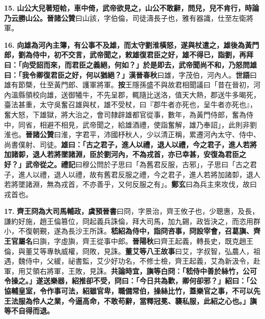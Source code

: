 \textbf{15.} \textbf{山公大兒著短帢，車中倚，武帝欲見之，山公不敢辭，問兒，兒不肯行，時論乃云勝山公。}{\footnotesize \textbf{晉諸公贊}曰山該，字伯倫，司徒濤長子也，雅有器識，仕至左衛將軍。}

\textbf{16.} \textbf{向雄為河內主簿，有公事不及雄，而太守劉淮橫怒，遂與杖遣之，雄後為黃門郎，劉為侍中，初不交言，武帝聞之，敕雄復君臣之好，雄不得已，詣劉，再拜曰：「向受詔而來，而君臣之義絕，何如？」於是即去，武帝聞尚不和，乃怒問雄曰：「我令卿復君臣之好，何以猶絕？」}{\footnotesize \textbf{漢晉春秋}曰雄，字茂伯，河內人。\textbf{世語}曰雄有節槩，仕至黃門郎、護軍將軍。\textbf{按}王隱孫盛不與故君相聞議曰「昔在晉初，河內溫縣領校向雄，送御犧牛，不先呈郡，輒隨比送洛，值天大熱，郡送牛多暍死，臺法甚重，太守吳奮召雄與杖，雄不受杖，曰『郡牛者亦死也，呈牛者亦死也』，奮大怒，下雄獄，將大治之，會司隸辟雄都官從事，數年，為黃門侍郎，奮為侍中，同省，相避不相見，武帝聞之，給雄酒禮，使詣奮解，雄乃奉詔」，此則非劉淮也。\textbf{晉諸公贊}曰淮，字君平，沛國杼秋人，少以清正稱，累遷河內太守、侍中、尚書僕射、司徒。}\textbf{雄曰：「古之君子，進人以禮，退人以禮，今之君子，進人若將加諸厀，退人若將墜諸淵，臣於劉河內，不為戎首，亦已幸甚，安復為君臣之好？」武帝從之。}{\footnotesize \textbf{禮記}曰穆公問於子思曰「為舊君反服，古邪」，子思曰「古之君子，進人以禮，退人以禮，故有舊君反服之禮，今之君子，進人若將加諸厀，退人若將墜諸淵，無為戎首，不亦善乎，又何反服之有」。\textbf{鄭玄}曰為兵主來攻伐，故曰戎首也。}

\textbf{17.} \textbf{齊王冏為大司馬輔政，}{\footnotesize \textbf{虞預晉書}曰冏，字景治，齊王攸子也，少聰惠，及長，謙約好施，趙王倫篡位，冏起義兵誅倫，拜大司馬，加九錫，政皆決之，而恣用群小，不復朝覲，遂為長沙王所誅。}\textbf{嵇紹為侍中，詣冏咨事，冏設宰會，召葛旟、}{\footnotesize \textbf{齊王官屬名}曰旟，字虛旟，齊王從事中郎。\textbf{晉陽秋}曰齊王起義，轉長史，既克趙王倫，與董艾等專執威權，冏敗，見誅。}\textbf{董艾等}{\footnotesize \textbf{八王故事}曰艾，字叔智，弘農人，祖遇，魏侍中，父緩，祕書監，艾少好功名，不修士檢，齊王起義，艾為新汲令，赴軍，用艾領右將軍，王敗，見誅。}\textbf{共論時宜，旟等白冏：「嵇侍中善於絲竹，公可令操之。」遂送樂器，紹推卻不受，冏曰：「今日共為歡，卿何卻邪？」紹曰：「公協輔皇室，令作事可法，紹雖官卑，職備常伯，操絲比竹，蓋樂官之事，不可以先王法服為伶人之業，今逼高命，不敢苟辭，當釋冠冕、襲私服，此紹之心也。」旟等不自得而退。}

